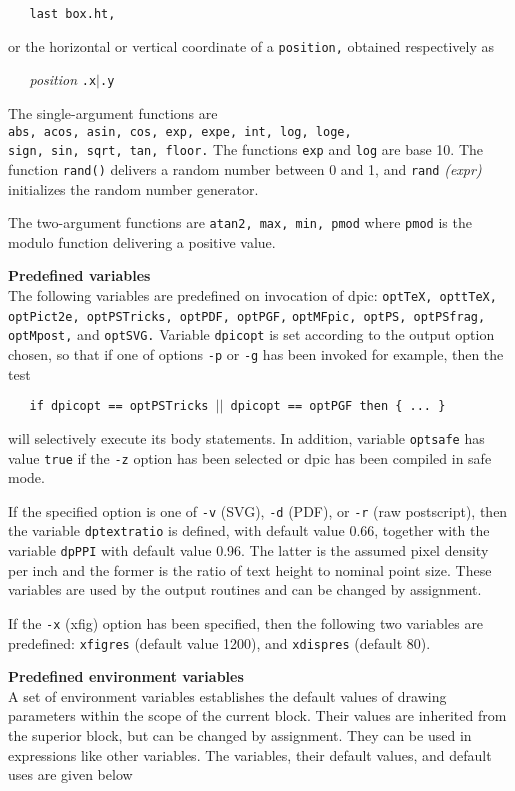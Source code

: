 {\tt \ \ \ last\ box.ht,}

or the horizontal or vertical coordinate of a
{\tt position,}
obtained respectively as

{\it \ \ \ position}
{\tt .x$|$.y}

The single-argument functions are
{\tt abs,\ acos,\ asin,\ cos,\ exp,\ expe,\ int,\ log,\ loge,}
{\tt sign,\ sin,\ sqrt,\ tan,\ floor.}
The functions
{\tt exp}
and
{\tt log}
are base 10.
The function
{\tt rand()}
delivers a random number between 0 and 1, and
{\tt rand}
{\it (expr)}
initializes the random number generator.

The two-argument functions are
{\tt atan2,\ max,\ min,\ pmod}
where
{\tt pmod}
is the modulo function delivering a positive value.
\par\hskip-2pc{\bf Predefined variables}\\
The following variables are predefined on invocation of dpic:
{\tt optTeX, opttTeX, optPict2e, optPSTricks, optPDF, optPGF,}
{\tt optMFpic, optPS, optPSfrag,}
\\\hbox{}\hskip-1pt
{\tt optMpost,}
and
{\tt optSVG.}
Variable
{\tt dpicopt}
is set according to the output option chosen, so that if one of options
{\tt -p}
or
{\tt -g}
has been invoked for example, then the test

{\tt \ \ \ if\ dpicopt\ ==\ optPSTricks\ $|$$|$\ dpicopt\ ==\ optPGF\ then\ \{\ ...\ \}}

will selectively execute its body statements.
In addition, variable
{\tt optsafe}
has value
{\tt true}
if the
{\tt -z}
option has been selected or dpic has been compiled in safe mode.

If the specified option is one of
{\tt -v}
(SVG),
{\tt -d}
(PDF), or
{\tt -r}
(raw postscript), then
the variable
{\tt dptextratio}
is defined, with default value 0.66, together with the variable
{\tt dpPPI}
with default value 0.96.  The latter is the assumed pixel density per inch
and the former is the ratio of text height to nominal point size.
These variables are used by the output routines and can be
changed by assignment.

If the
{\tt -x}
(xfig) option has been specified,
then the following two variables are predefined:
{\tt xfigres}
(default value 1200), and
{\tt xdispres}
(default 80).
\par\hskip-2pc{\bf Predefined environment variables}\\
A set of environment variables establishes the default values of drawing
parameters within the scope of the current block.
Their values are inherited from the superior block, but can be changed
by assignment.
They can be used in expressions like other variables.
The variables, their default values, and default uses are given below

